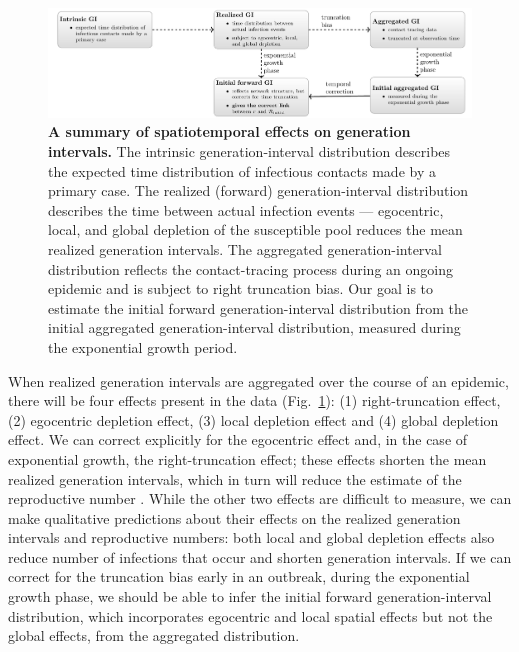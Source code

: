 \documentclass[12pt]{article}
\newcommand{\fref}[1]{Fig.~\ref{fig:#1}}
\begin{document}
\begin{figure}[!ht]
\includegraphics[width=\textwidth]{diagram.pdf}
\caption{
\textbf{A summary of spatiotemporal effects on generation intervals.}
The intrinsic generation-interval distribution describes the expected time distribution of infectious contacts made by a primary case.
The realized (forward) generation-interval distribution describes the time between actual infection events --- egocentric, local, and global depletion of the susceptible pool reduces the mean realized generation intervals.
The aggregated generation-interval distribution reflects the contact-tracing process during an ongoing epidemic and is subject to right truncation bias.
Our goal is to estimate the initial forward generation-interval distribution from the initial aggregated generation-interval distribution, measured during the exponential growth period.
}
\label{fig:diagram}
\end{figure}

When realized generation intervals are aggregated over the course of an epidemic, there will be four effects present in the data (\fref{diagram}): (1) right-truncation effect, (2) egocentric depletion effect, (3) local depletion effect and (4) global depletion effect.
We can correct explicitly for the egocentric effect and, in the case of exponential growth, the right-truncation effect;
these effects shorten the mean realized generation intervals, which in turn will reduce the estimate of the reproductive number \cite{wallinga2007generation, park2019practical}.
While the other two effects are difficult to measure, we can make qualitative predictions about their effects on the realized generation intervals and reproductive numbers: 
both local and global depletion effects also reduce number of infections that occur and shorten generation intervals.
If we can correct for the truncation bias early in an outbreak, during the exponential growth phase, we should be able to infer the initial forward generation-interval distribution, which incorporates egocentric and local spatial effects but not the global effects, from the aggregated distribution.
\end{document}
